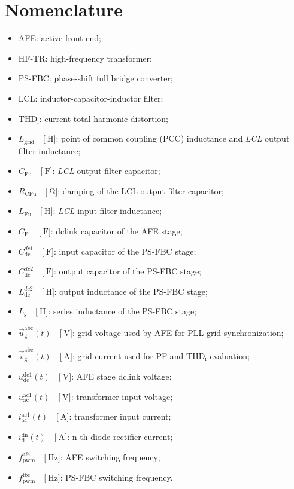 \documentclass[11pt,a4paper]{scrartcl}
\begin{document}
\section*{Nomenclature}
\begin{itemize}
	\item[--] AFE: active front end;
	\item[--] HF-TR: high-frequency transformer;
	\item[--] PS-FBC: phase-shift full bridge converter;
	\item[--] LCL: inductor-capacitor-inductor filter;
	\item[--] $\text{THD}_\text{i}$: current total harmonic distortion;
	\item[--] $L_\text{grid}\quad\Big[\SI{}{\henry}\Big]$: point of common coupling ({PCC}) inductance and \emph{LCL} output filter inductance;
	\item[--] $C_\text{Fu}\quad\Big[\SI{}{\farad}\Big]$: \emph{LCL} output filter capacitor;	
	\item[--] $R_\text{CFu}\quad\Big[\SI{}{\ohm}\Big]$: damping of the LCL output filter capacitor;	
	\item[--] $L_\text{Fu}\quad\Big[\SI{}{\henry}\Big]$: \emph{LCL} input filter inductance;	
	\item[--] $C_\text{Fi}\quad\Big[\SI{}{\farad}\Big]$: dclink capacitor of the AFE stage;	
	\item[--] $C_\text{dc}^{dc1}\quad\Big[\SI{}{\farad}\Big]$: input capacitor of the PS-FBC stage;	
	\item[--] $C_\text{dc}^{dc2}\quad\Big[\SI{}{\farad}\Big]$: output capacitor of the PS-FBC stage;	
	\item[--] $L_\text{dc}^{dc2}\quad\Big[\SI{}{\henry}\Big]$: output inductance of the PS-FBC stage;
	\item[--] $L_\text{s}\quad\Big[\SI{}{\henry}\Big]$: series inductance of the PS-FBC stage;	
	\item[--] $\vec{u}_\text{g}^\text{abc}(t)\quad\Big[\SI{}{\volt}\Big]$: grid voltage used by AFE for PLL grid synchronization;	
	\item[--] $\vec{i}_\text{g}^\text{abc}(t)\quad\Big[\SI{}{\ampere}\Big]$: grid current used for PF and $\text{THD}_\text{i}$ evaluation;	
	\item[--] $u_\text{dc}^\text{dc1}(t)\quad\Big[\SI{}{\volt}\Big]$: AFE stage dclink voltage;	
	\item[--] $u_\text{ac}^\text{ac1}(t)\quad\Big[\SI{}{\volt}\Big]$: transformer input voltage;			
	\item[--] $i_\text{ac}^\text{ac1}(t)\quad\Big[\SI{}{\ampere}\Big]$: transformer input current;		
	\item[--] $i_\text{d}^\text{dn}(t)\quad\Big[\SI{}{\ampere}\Big]$: n-th diode rectifier current;	
	\item[--] $f_\text{pwm}^\text{afe}\quad\Big[\SI{}{\hertz}\Big]$: AFE switching frequency;
	\item[--] $f_\text{pwm}^\text{fbc}\quad\Big[\SI{}{\hertz}\Big]$: PS-FBC switching frequency.		
\end{itemize}
\end{document}
